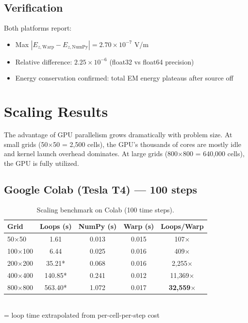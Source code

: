 \documentclass[11pt,a4paper]{article}
\begin{document}
\subsection{Verification}

Both platforms report:
\begin{itemize}[nosep]
    \item Max $|E_{z,\text{Warp}} - E_{z,\text{NumPy}}| = 2.70 \times 10^{-7}$ V/m
    \item Relative difference: $2.25 \times 10^{-6}$ (float32 vs float64 precision)
    \item Energy conservation confirmed: total EM energy plateaus after source off
\end{itemize}


\section{Scaling Results}

The advantage of GPU parallelism grows dramatically with problem size. At small grids (50$\times$50 = 2,500 cells), the GPU's thousands of cores are mostly idle and kernel launch overhead dominates. At large grids (800$\times$800 = 640,000 cells), the GPU is fully utilized.

\subsection{Google Colab (Tesla T4) --- 100 steps}

\begin{table}[H]
\centering
\caption{Scaling benchmark on Colab (100 time steps).}
\begin{tabular}{@{}lcccc@{}}
\toprule
\textbf{Grid} & \textbf{Loops (s)} & \textbf{NumPy (s)} & \textbf{Warp (s)} & \textbf{Loops/Warp} \\
\midrule
50$\times$50     & 1.61   & 0.013 & 0.015 & 107$\times$ \\
100$\times$100   & 6.44   & 0.025 & 0.016 & 409$\times$ \\
200$\times$200   & 35.21* & 0.068 & 0.016 & 2,255$\times$ \\
400$\times$400   & 140.85* & 0.241 & 0.012 & 11,369$\times$ \\
800$\times$800   & 563.40* & 1.072 & 0.017 & \textbf{32,559$\times$} \\
\bottomrule
\end{tabular}
\\[4pt]
{\footnotesize * = loop time extrapolated from per-cell-per-step cost}
\end{table}
\end{document}
